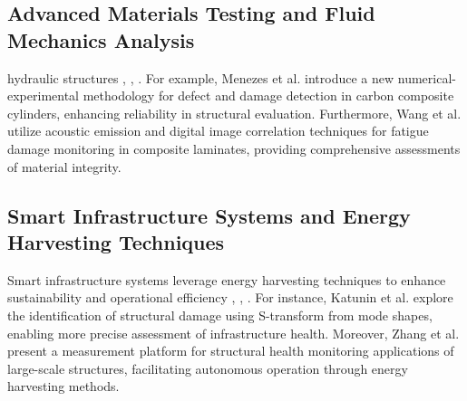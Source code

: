 \documentclass[journal, a4paper]{IEEEtran}
\begin{document}
\subsection{Advanced Materials Testing and Fluid Mechanics Analysis}
hydraulic structures \cite{katunin_identification_2021}, \cite{katunin_modeling_2021}, \cite{wang_fatigue_2023}. For example, Menezes et al. \cite{katunin_identification_2021} introduce a new numerical-experimental methodology for defect and damage detection in carbon composite cylinders, enhancing reliability in structural evaluation. Furthermore, Wang et al. \cite{wang_fatigue_2023} utilize acoustic emission and digital image correlation techniques for fatigue damage monitoring in composite laminates, providing comprehensive assessments of material integrity.


\subsection{Smart Infrastructure Systems and Energy Harvesting Techniques}
Smart infrastructure systems leverage energy harvesting techniques to enhance sustainability and operational efficiency \cite{katunin_modeling_2021}, \cite{tabjula_sparse_2023}, \cite{han_crack_2021}. For instance, Katunin et al. \cite{katunin_modeling_2021} explore the identification of structural damage using S-transform from mode shapes, enabling more precise assessment of infrastructure health. Moreover, Zhang et al. \cite{tabjula_sparse_2023} present a measurement platform for structural health monitoring applications of large-scale structures, facilitating autonomous operation through energy harvesting methods.
\end{document}
